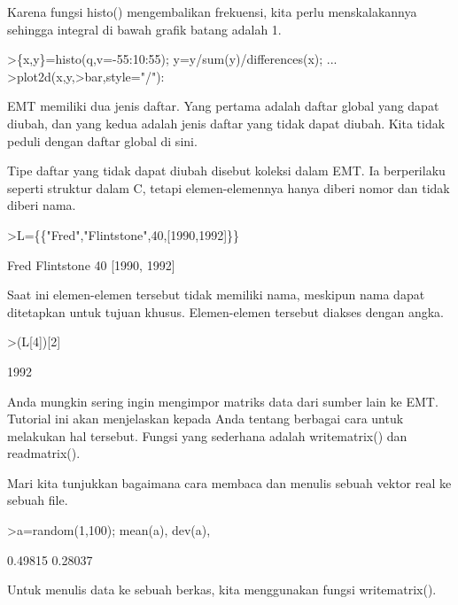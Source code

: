 \documentclass[a4paper,10pt]{article}
\begin{document}
\begin{eulernotebook}
\begin{eulercomment}
\begin{eulercomment}
\begin{eulercomment}
\begin{eulercomment}
\begin{eulercomment}
Karena fungsi histo() mengembalikan frekuensi, kita perlu
menskalakannya sehingga integral di bawah grafik batang adalah 1.
\end{eulercomment}
\begin{eulerprompt}
>\{x,y\}=histo(q,v=-55:10:55); y=y/sum(y)/differences(x); ...
>plot2d(x,y,>bar,style="/"):
\end{eulerprompt}
\begin{eulercomment}
EMT memiliki dua jenis daftar. Yang pertama adalah daftar global yang
dapat diubah, dan yang kedua adalah jenis daftar yang tidak dapat
diubah. Kita tidak peduli dengan daftar global di sini.

Tipe daftar yang tidak dapat diubah disebut koleksi dalam EMT. Ia
berperilaku seperti struktur dalam C, tetapi elemen-elemennya hanya
diberi nomor dan tidak diberi nama.
\end{eulercomment}
\begin{eulerprompt}
>L=\{\{"Fred","Flintstone",40,[1990,1992]\}\}
\end{eulerprompt}
\begin{euleroutput}
  Fred
  Flintstone
  40
  [1990,  1992]
\end{euleroutput}
\begin{eulercomment}
Saat ini elemen-elemen tersebut tidak memiliki nama, meskipun nama
dapat ditetapkan untuk tujuan khusus. Elemen-elemen tersebut diakses
dengan angka.
\end{eulercomment}
\begin{eulerprompt}
>(L[4])[2]
\end{eulerprompt}
\begin{euleroutput}
  1992
\end{euleroutput}
\begin{eulercomment}
\begin{eulercomment}
\begin{eulercomment}
Anda mungkin sering ingin mengimpor matriks data dari sumber lain ke
EMT. Tutorial ini akan menjelaskan kepada Anda tentang berbagai cara
untuk melakukan hal tersebut. Fungsi yang sederhana adalah
writematrix() dan readmatrix().

Mari kita tunjukkan bagaimana cara membaca dan menulis sebuah vektor
real ke sebuah file.
\end{eulercomment}
\begin{eulerprompt}
>a=random(1,100); mean(a), dev(a),
\end{eulerprompt}
\begin{euleroutput}
  0.49815
  0.28037
\end{euleroutput}
\begin{eulercomment}
Untuk menulis data ke sebuah berkas, kita menggunakan fungsi
writematrix().


\end{eulercomment}
\end{eulercomment}
\end{eulercomment}
\end{eulercomment}
\end{eulercomment}
\end{eulercomment}
\end{eulercomment}
\end{eulernotebook}
\end{document}
